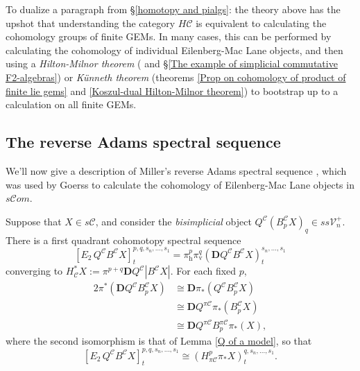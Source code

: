\documentclass[11pt]{amsart} \renewcommand{\baselinestretch}{1.2}
\theoremstyle{plain}
\theoremstyle{definition}
\newcommand{\scrC}{\mathscr{C}}
\newcommand{\calC}{\mathcal{C}}
\newcommand{\calV}{\mathcal{V}}
\newcommand{\calc}{\mathcal{C}}
\newcommand{\citeBOX}[2][]{\cite[\mbox{#1}]{#2}}
\newcommand{\vect}[2]{\calV^{#1}_{#2}}
\newcommand{\PA}[1]{\pi#1}
\newcommand{\HA}[1]{H#1}
\newcommand{\algs}{{\scrC\!\textit{om}}}
\newcommand{\Edown}[4]{[E_{#1}#2]^{#3}_{#4}}
\newcommand{\uver}{^\mathrm{v}}
\newcommand{\dver}{_\mathrm{v}}
\newcommand{\dhor}{_\mathrm{h}}
\newcommand{\diag}[1]{|#1|}
\newcommand{\dual}{\mathbf{D}}
\begin{document}
\begin{Pi-algebras and cohomology algebras}
To dualize a paragraph from \S\ref{homotopy and pialgs}: the theory above has the upshot that understanding the category $\HA{\calc}$ is equivalent to calculating the cohomology groups of finite GEMs. In many cases, this can be performed by calculating the cohomology of individual Eilenberg-Mac Lane objects, and then using a \emph{Hilton-Milnor theorem} (\citeBOX[\S11]{MR1089001} and \S\ref{The example of simplicial commutative F2-algebras}) or \emph{K\"unneth theorem} (theorems \ref{Prop on cohomology of product of finite lie gems} and \ref{Koszul-dual Hilton-Milnor theorem}) to bootstrap up to a calculation on all finite GEMs.

\subsection{The reverse Adams spectral sequence}
\label{reverse Adams spectral sequence}
We'll now give a description of Miller's reverse Adams spectral sequence \citeBOX[\S4]{MillerSullivanConjecture.pdf}, which was used by Goerss \cite[Chapter V]{MR1089001} to calculate the cohomology of Eilenberg-Mac Lane objects in $s\algs$.

Suppose that $X\in s\calC$, and consider the \emph{bisimplicial} object $Q^{\calc}(B^{\calc}_pX)_{q}\in ss\vect{+}{n}$. There is a first quadrant cohomotopy spectral sequence
\[\Edown{2}{\,Q^{\calc}B^{\calc}X}{p,q,s_n,\ldots,s_1}{t}=\pi\dhor^{p}\pi\dver^{q}(\dual Q^{\calc}B^{\calc}X)^{s_n,\ldots,s_1}_{t}\]
converging to $H^*_{\calc}X:=\pi^{p+q}\dual Q^{\calc}\diag{B^{\calc}X}$. For each fixed $p$, %
\begin{alignat*}{2}
\pi^{*}(\dual Q^{\calc}B^{\calc}_p X)&\cong\dual \pi_{*}(Q^{\calc}B^{\calc}_p X)\\
&\cong\dual Q^{\PA{\calc}}\pi_{*}(B^{\calc}_p X)\\
&\cong\dual Q^{\PA{\calc}}B^{\PA{\calc}}_p \pi_{*}(X),{}
\end{alignat*}
where the second isomorphism is that of Lemma \ref{Q of a model}, so that 
\[\Edown{2}{\,Q^{\calc}B^{\calc}X}{p,q,s_n,\ldots,s_1}{t}\cong (H^{p}_{\PA{\calc}}\pi_*X)^{q,s_n,\ldots,s_1}_{t}.\]


\end{Pi-algebras and cohomology algebras}
\end{document}
